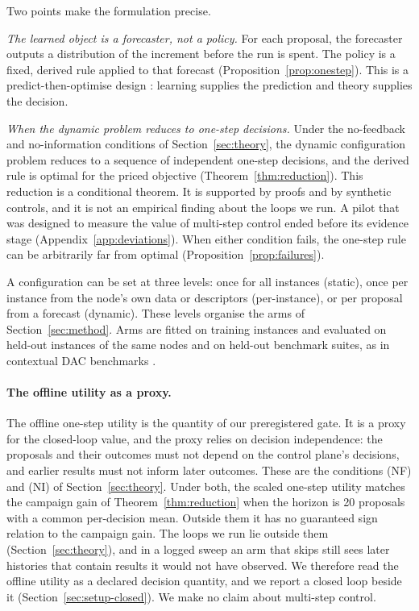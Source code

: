 Two points make the formulation precise.

\emph{The learned object is a forecaster, not a policy.} For each proposal, the forecaster outputs a distribution of the increment before the run is spent. The policy is a fixed, derived rule applied to that forecast (Proposition~\ref{prop:onestep}). This is a predict-then-optimise design \citep{arxiv171008005,wilder2019melding}: learning supplies the prediction and theory supplies the decision.

\emph{When the dynamic problem reduces to one-step decisions.} Under the no-feedback and no-information conditions of Section~\ref{sec:theory}, the dynamic configuration problem reduces to a sequence of independent one-step decisions, and the derived rule is optimal for the priced objective (Theorem~\ref{thm:reduction}). This reduction is a conditional theorem. It is supported by proofs and by synthetic controls, and it is not an empirical finding about the loops we run. A pilot that was designed to measure the value of multi-step control ended before its evidence stage (Appendix~\ref{app:deviations}). When either condition fails, the one-step rule can be arbitrarily far from optimal (Proposition~\ref{prop:failures}).

A configuration can be set at three levels: once for all instances (static), once per instance from the node's own data or descriptors (per-instance), or per proposal from a forecast (dynamic). These levels organise the arms of Section~\ref{sec:method}. Arms are fitted on training instances and evaluated on held-out instances of the same nodes and on held-out benchmark suites, as in contextual DAC benchmarks \citep{eimer2021dacbench}.

\paragraph{The offline utility as a proxy.}
The offline one-step utility is the quantity of our preregistered gate. It is a proxy for the closed-loop value, and the proxy relies on decision independence: the proposals and their outcomes must not depend on the control plane's decisions, and earlier results must not inform later outcomes. These are the conditions (NF) and (NI) of Section~\ref{sec:theory}. Under both, the scaled one-step utility matches the campaign gain of Theorem~\ref{thm:reduction} when the horizon is 20 proposals with a common per-decision mean. Outside them it has no guaranteed sign relation to the campaign gain. The loops we run lie outside them (Section~\ref{sec:theory}), and in a logged sweep an arm that skips still sees later histories that contain results it would not have observed. We therefore read the offline utility as a declared decision quantity, and we report a closed loop beside it (Section~\ref{sec:setup-closed}). We make no claim about multi-step control.

